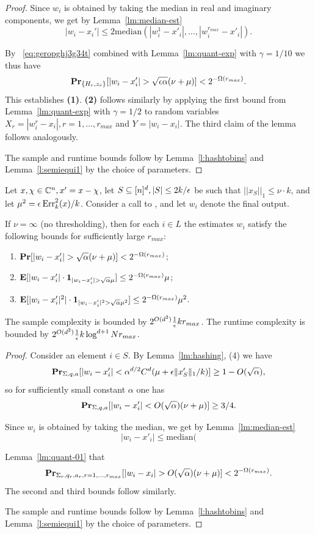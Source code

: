 \begin{proof}
Since $w_i$ is obtained by taking the median in real and imaginary components, we get by Lemma~\ref{lm:median-est}
$$
|w_i-x_i'|\leq 2\text{median}(|w^1_i-x'_i|, \ldots, |w^{r_{max}}_i-x'_i|).
$$

By ~\eqref{eq:geropghj3g34t} combined with Lemma~\ref{lm:quant-exp} with $\gamma=1/10$ we thus have
$$
\prob_{\{H_r, z_r\}}[|w_i-x'_i|>\sqrt{\e \alpha}(\nu+\mu)]<2^{-\Omega(r_{max})}.
$$
This establishes {\bf (1)}. {\bf (2)} follows similarly by applying the first bound from Lemma~\ref{lm:quant-exp} with $\gamma=1/2$ to random variables $X_r=|w^r_i-x_i|, r=1,\ldots, r_{max}$ and $Y=|w_i-x_i|$.
The third claim of the lemma follows analogously.

The sample and runtime bounds follow by Lemma~\ref{l:hashtobins} and Lemma~\ref{l:semiequi1} by the choice of parameters.
\end{proof}


\begin{lemma}\label{lm:estimate}
Let $x, \chi\in \C^n, x'=x-\chi$, let $S\subseteq \nsq, |S|\leq 2k/\e$ be such that $||x_S||_1\leq \nu\cdot k$, and let $\mu^2=\e \err_k^2(x)/k$.
Consider a call to , and let $w_i$ denote the final output. 

If $\nu=\infty$ (no thresholding), then for each $i\in L$ the estimates $w_i$ satisfy the following bounds for sufficiently large $r_{max}$:
\begin{enumerate}
\item $\prob[|w_i- x'_i|>\sqrt{\alpha}(\nu+\mu)]<2^{-\Omega(r_{max})}$;
\item $\expect[|w_i- x'_i|\cdot \mathbf{1}_{|w_i- x'_i|>\sqrt{\alpha}\mu}]\leq 2^{-\Omega(r_{max})}\mu$;
\item $\expect[|w_i-x'_i|^2| \cdot \mathbf{1}_{| w_i- x'_i|^2>\sqrt{\alpha}\mu^2}]\leq 2^{-\Omega(r_{max})}\mu^2$.
\fi
\end{enumerate}
The sample complexity is bounded by $2^{O(d^2)}\frac1{\e} k r_{max}$. The runtime complexity is bounded by $2^{O(d^2)}\frac1{\e}k \log^{d+1} N r_{max}$.
\end{lemma}
\begin{proof}
Consider an element $i\in S$. By Lemma~\ref{lm:hashing}, (4) we have
$$
\prob_{\Sigma, q, a}[|w_i-x'_i|< \alpha^{d/2}C^d (\mu+\e\norm{1}{x'_S}/k)]\geq 1-O(\sqrt{\alpha}),
$$
so for sufficiently small constant $\alpha$ one has 
$$
\prob_{\Sigma, q, a}[|w_i-x'_i|<O(\sqrt{\alpha})(\nu+\mu)]\geq 3/4.
$$

Since $w_i$ is obtained by taking the median, we get by Lemma~\ref{lm:median-est}
$$
|w_i-x'_i|\leq \text{median}(
$$

Lemma~\ref{lm:quant-01} that 
$$
\prob_{\Sigma_r, q_r, a_r, r=1,\ldots, r_{max}}[|w_i-x_i|>O(\sqrt{\alpha})(\nu+\mu)]<2^{-\Omega(r_{max})}.
$$
The second and third bounds follow similarly.

The sample and runtime bounds follow by Lemma~\ref{l:hashtobins} and Lemma~\ref{l:semiequi1} by the choice of parameters.
\end{proof}
\fi 

